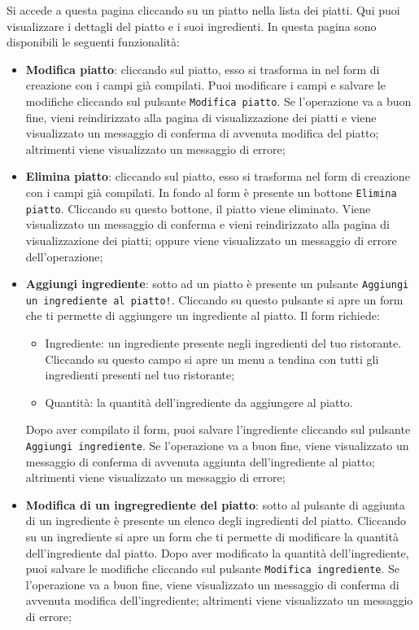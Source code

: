 Si accede a questa pagina cliccando su un piatto nella lista dei piatti. Qui
puoi visualizzare i dettagli del piatto e i suoi ingredienti. In questa pagina
sono disponibili le seguenti funzionalità:
\begin{itemize}
	\item \textbf{Modifica piatto}: cliccando sul piatto, esso si trasforma in
		nel form di creazione con i campi già compilati. Puoi modificare i
		campi e salvare le modifiche cliccando sul pulsante \texttt{Modifica
		piatto}. Se l'operazione va a buon fine, vieni reindirizzato alla
		pagina di visualizzazione dei piatti e viene visualizzato un messaggio
		di conferma di avvenuta modifica del piatto; altrimenti viene
		visualizzato un messaggio di errore;

	\item \textbf{Elimina piatto}: cliccando sul piatto, esso si trasforma nel
		form di creazione con i campi già compilati. In fondo al form è presente
		un bottone \texttt{Elimina piatto}. Cliccando su questo bottone, il
		piatto viene eliminato. Viene visualizzato un messaggio di conferma e
		vieni reindirizzato alla pagina di visualizzazione dei piatti; oppure 
		viene visualizzato un messaggio di errore dell'operazione;

	\item \textbf{Aggiungi ingrediente}: sotto ad un piatto è presente un
		pulsante \texttt{Aggiungi un ingrediente al piatto!}. Cliccando su
		questo pulsante si apre un form che ti permette di aggiungere un
		ingrediente al piatto. Il form richiede:
		\begin{itemize}
			\item Ingrediente: un ingrediente presente negli ingredienti del tuo
				ristorante. Cliccando su questo campo si apre un menu a
				tendina con tutti gli ingredienti presenti nel tuo ristorante;

			\item Quantità: la quantità dell'ingrediente da aggiungere al piatto.
		\end{itemize}

		Dopo aver compilato il form, puoi salvare l'ingrediente cliccando sul
		pulsante \texttt{Aggiungi ingrediente}. Se l'operazione va a buon fine,
		viene visualizzato un messaggio di conferma di avvenuta aggiunta
		dell'ingrediente al piatto; altrimenti viene visualizzato un messaggio
		di errore;

	\item \textbf{Modifica di un ingregrediente del piatto}: sotto al pulsante
		di aggiunta di un ingrediente è presente un elenco degli ingredienti
		del piatto. Cliccando su un ingrediente si apre un form che ti permette
		di modificare la quantità dell'ingrediente dal piatto. Dopo aver 
		modificato la quantità
		dell'ingrediente, puoi salvare le modifiche cliccando sul pulsante
		\texttt{Modifica ingrediente}. Se l'operazione va a buon fine, viene visualizzato un
		messaggio di conferma di avvenuta modifica dell'ingrediente; altrimenti
		viene visualizzato un messaggio di errore;


\end{itemize}
